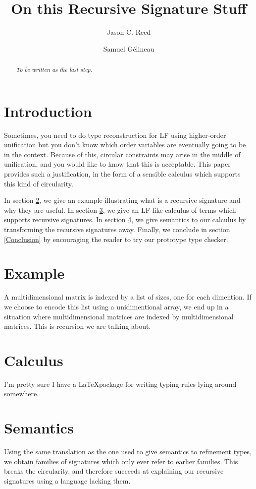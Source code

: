 \documentclass{article}
\title{On this Recursive Signature Stuff}
\author{Jason C. Reed \and Samuel G\'elineau}
\begin{document}
\maketitle

\begin{abstract}\em
To be written as the last step.
\end{abstract}

\section{Introduction}\label{Introduction}
Sometimes, you need to do type reconstruction for LF using higher-order unification but you don't know which order variables are eventually going to be in the context. Because of this, circular constraints may arise in the middle of unification, and you would like to know that this is acceptable. This paper provides such a justification, in the form of a sensible calculus which supports this kind of circularity.

In section \ref{Example}, we give an example illustrating what is a recursive signature and why they are useful. In section \ref{Calculus}, we give an LF-like calculus of terms which supports recursive signatures. In section \ref{Semantics}, we give semantics to our calculus by transforming the recursive signatures away. Finally, we conclude in section \ref{Conclusion} by encouraging the reader to try our prototype type checker.

\section{Example}\label{Example}
A multidimensional matrix is indexed by a list of sizes, one for each dimention. If we choose to encode this list using a unidimentional array, we end up in a situation where multidimensional matrices are indexed by multidimensional matrices. This is recursion we are talking about.

\section{Calculus}\label{Calculus}
I'm pretty sure I have a \LaTeX package for writing typing rules lying around somewhere.

\section{Semantics}\label{Semantics}
Using the same translation as the one used to give semantics to refinement types, we obtain families of signatures which only ever refer to earlier families. This breaks the circularity, and therefore succeeds at explaining our recursive signatures using a language lacking them.
\end{document}
